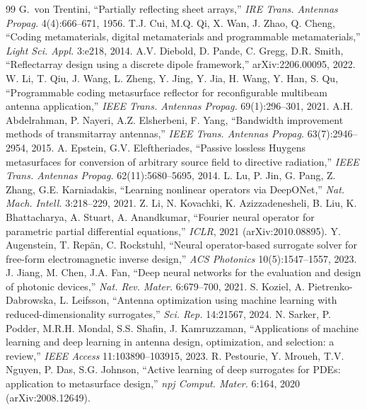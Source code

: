\documentclass[11pt]{article}
\begin{document}
\begin{thebibliography}{99}
\small
{} G.~von Trentini, ``Partially reflecting sheet arrays,'' \emph{IRE Trans. Antennas Propag.} 4(4):666--671, 1956.
 T.J. Cui, M.Q. Qi, X. Wan, J. Zhao, Q. Cheng, ``Coding metamaterials, digital metamaterials and programmable metamaterials,'' \emph{Light Sci. Appl.} 3:e218, 2014.
 A.V. Diebold, D. Pande, C. Gregg, D.R. Smith, ``Reflectarray design using a discrete dipole framework,'' arXiv:2206.00095, 2022.
 W. Li, T. Qiu, J. Wang, L. Zheng, Y. Jing, Y. Jia, H. Wang, Y. Han, S. Qu, ``Programmable coding metasurface reflector for reconfigurable multibeam antenna application,'' \emph{IEEE Trans. Antennas Propag.} 69(1):296--301, 2021.
 A.H. Abdelrahman, P. Nayeri, A.Z. Elsherbeni, F. Yang, ``Bandwidth improvement methods of transmitarray antennas,'' \emph{IEEE Trans. Antennas Propag.} 63(7):2946--2954, 2015.
 A. Epstein, G.V. Eleftheriades, ``Passive lossless Huygens metasurfaces for conversion of arbitrary source field to directive radiation,'' \emph{IEEE Trans. Antennas Propag.} 62(11):5680--5695, 2014.
 L. Lu, P. Jin, G. Pang, Z. Zhang, G.E. Karniadakis, ``Learning nonlinear operators via DeepONet,'' \emph{Nat. Mach. Intell.} 3:218--229, 2021.
 Z. Li, N. Kovachki, K. Azizzadenesheli, B. Liu, K. Bhattacharya, A. Stuart, A. Anandkumar, ``Fourier neural operator for parametric partial differential equations,'' \emph{ICLR}, 2021 (arXiv:2010.08895).
 Y. Augenstein, T. Rep\"an, C. Rockstuhl, ``Neural operator-based surrogate solver for free-form electromagnetic inverse design,'' \emph{ACS Photonics} 10(5):1547--1557, 2023.
 J. Jiang, M. Chen, J.A. Fan, ``Deep neural networks for the evaluation and design of photonic devices,'' \emph{Nat. Rev. Mater.} 6:679--700, 2021.
 S. Koziel, A. Pietrenko-Dabrowska, L. Leifsson, ``Antenna optimization using machine learning with reduced-dimensionality surrogates,'' \emph{Sci. Rep.} 14:21567, 2024.
 N. Sarker, P. Podder, M.R.H. Mondal, S.S. Shafin, J. Kamruzzaman, ``Applications of machine learning and deep learning in antenna design, optimization, and selection: a review,'' \emph{IEEE Access} 11:103890--103915, 2023.
 R. Pestourie, Y. Mroueh, T.V. Nguyen, P. Das, S.G. Johnson, ``Active learning of deep surrogates for PDEs: application to metasurface design,'' \emph{npj Comput. Mater.} 6:164, 2020 (arXiv:2008.12649).

\end{thebibliography}
\end{document}
